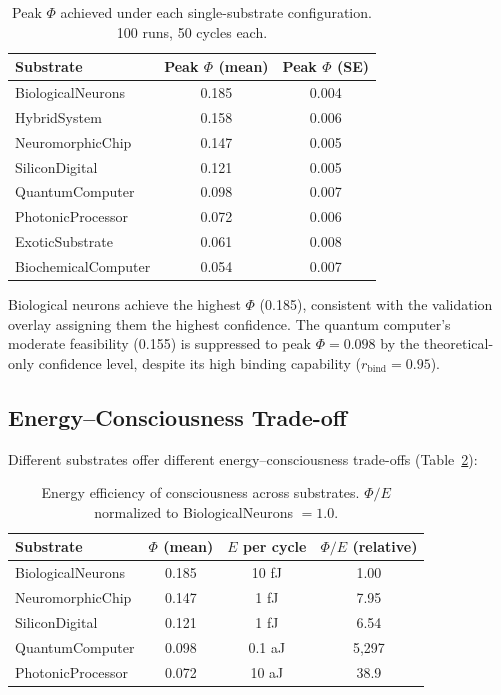 \documentclass[12pt,a4paper]{article}
\begin{document}
\begin{table}[H]
\centering
\caption{Peak $\Phi$ achieved under each single-substrate configuration. 100 runs, 50 cycles each.}
\label{tab:peak-phi}
\begin{tabular}{lcc}
\toprule
\textbf{Substrate} & \textbf{Peak $\Phi$ (mean)} & \textbf{Peak $\Phi$ (SE)} \\
\midrule
BiologicalNeurons & 0.185 & 0.004 \\
HybridSystem & 0.158 & 0.006 \\
NeuromorphicChip & 0.147 & 0.005 \\
SiliconDigital & 0.121 & 0.005 \\
QuantumComputer & 0.098 & 0.007 \\
PhotonicProcessor & 0.072 & 0.006 \\
ExoticSubstrate & 0.061 & 0.008 \\
BiochemicalComputer & 0.054 & 0.007 \\
\bottomrule
\end{tabular}
\end{table}

Biological neurons achieve the highest $\Phi$ (0.185), consistent with the validation overlay assigning them the highest confidence. The quantum computer's moderate feasibility (0.155) is suppressed to peak $\Phi = 0.098$ by the theoretical-only confidence level, despite its high binding capability ($r_{\text{bind}} = 0.95$).

\subsection{Energy--Consciousness Trade-off}

Different substrates offer different energy--consciousness trade-offs (Table~\ref{tab:energy}):

\begin{table}[H]
\centering
\caption{Energy efficiency of consciousness across substrates. $\Phi/E$ normalized to BiologicalNeurons $= 1.0$.}
\label{tab:energy}
\begin{tabular}{lccc}
\toprule
\textbf{Substrate} & \textbf{$\Phi$ (mean)} & \textbf{$E$ per cycle} & \textbf{$\Phi/E$ (relative)} \\
\midrule
BiologicalNeurons & 0.185 & 10 fJ & 1.00 \\
NeuromorphicChip & 0.147 & 1 fJ & 7.95 \\
SiliconDigital & 0.121 & 1 fJ & 6.54 \\
QuantumComputer & 0.098 & 0.1 aJ & 5,297 \\
PhotonicProcessor & 0.072 & 10 aJ & 38.9 \\
\bottomrule
\end{tabular}
\end{table}
\end{document}
